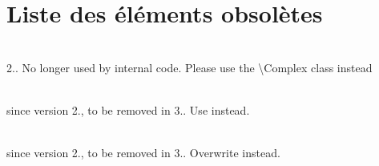 \chapter{Liste des éléments obsolètes}
\hypertarget{deprecated}{}\label{deprecated}

\begin{DoxyRefList}
\item[Membre \doxylink{class_php_office_1_1_php_spreadsheet_1_1_calculation_1_1_engineering_a20568d404f5b5fccba1449eb6485174d}{Php\+Office\textbackslash{}Php\+Spreadsheet\textbackslash{}Calculation\textbackslash{}Engineering\+::parse\+Complex} (\$complex\+Number)]\hfill \\
\label{deprecated__deprecated000001}%
%
2.. No longer used by internal code. Please use the \textbackslash{}\+Complex class instead 
\item[Class \doxylink{class_symfony_1_1_component_1_1_translation_1_1_catalogue_1_1_diff_operation}{Symfony\textbackslash{}Component\textbackslash{}Translation\textbackslash{}Catalogue\textbackslash{}Diff\+Operation} ]\hfill \\
\label{deprecated__deprecated000002}%
%
since version 2., to be removed in 3.. Use  instead.  
\item[Membre \doxylink{class_symfony_1_1_component_1_1_translation_1_1_dumper_1_1_file_dumper_a2ac388ef7cc4edc15ae0584ec8533fc1}{Symfony\textbackslash{}Component\textbackslash{}Translation\textbackslash{}Dumper\textbackslash{}File\+Dumper\+::format} (\doxylink{class_symfony_1_1_component_1_1_translation_1_1_message_catalogue}{Message\+Catalogue} \$messages, \$domain)]\hfill \\
\label{deprecated__deprecated000003}%
%
since version 2., to be removed in 3.. Overwrite  instead.  
\item[Membre \doxylink{class_symfony_1_1_component_1_1_translation_1_1_translator_a848e843566473151601a37bba1f9c445}{Symfony\textbackslash{}Component\textbackslash{}Translation\textbackslash{}Translator\+::get\+Messages} (\$locale=null)]\hfill \\

\end{DoxyRefList}
